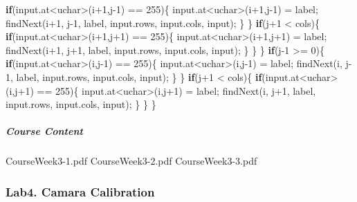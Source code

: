 \documentclass[]{article}
\newenvironment{Shaded}{\begin{snugshade}}{\end{snugshade}}
\newcommand{\KeywordTok}[1]{\textcolor[rgb]{0.13,0.29,0.53}{\textbf{{#1}}}}
\newcommand{\DataTypeTok}[1]{\textcolor[rgb]{0.13,0.29,0.53}{{#1}}}
\newcommand{\DecValTok}[1]{\textcolor[rgb]{0.00,0.00,0.81}{{#1}}}
\newcommand{\NormalTok}[1]{{#1}}
\let\oldsubparagraph\subparagraph
\renewcommand{\subparagraph}[1]{\oldsubparagraph{#1}\mbox{}}
\begin{document}
\begin{Shaded}
\begin{Highlighting}[]
            \KeywordTok{if}\NormalTok{(input.at<}\DataTypeTok{uchar}\NormalTok{>(i}\DecValTok{+1}\NormalTok{,j}\DecValTok{-1}\NormalTok{) == }\DecValTok{255}\NormalTok{)\{}
                \NormalTok{input.at<}\DataTypeTok{uchar}\NormalTok{>(i}\DecValTok{+1}\NormalTok{,j}\DecValTok{-1}\NormalTok{) = label;}
                \NormalTok{findNext(i}\DecValTok{+1}\NormalTok{, j}\DecValTok{-1}\NormalTok{, label, input.rows, input.cols, input);}
            \NormalTok{\}}
        \NormalTok{\}}
        \KeywordTok{if}\NormalTok{(j}\DecValTok{+1} \NormalTok{< cols)\{}
            \KeywordTok{if}\NormalTok{(input.at<}\DataTypeTok{uchar}\NormalTok{>(i}\DecValTok{+1}\NormalTok{,j}\DecValTok{+1}\NormalTok{) == }\DecValTok{255}\NormalTok{)\{}
                \NormalTok{input.at<}\DataTypeTok{uchar}\NormalTok{>(i}\DecValTok{+1}\NormalTok{,j}\DecValTok{+1}\NormalTok{) = label;}
                \NormalTok{findNext(i}\DecValTok{+1}\NormalTok{, j}\DecValTok{+1}\NormalTok{, label, input.rows, input.cols, input);}
            \NormalTok{\}}
        \NormalTok{\}}
    \NormalTok{\}}
    \KeywordTok{if}\NormalTok{(j}\DecValTok{-1} \NormalTok{>= }\DecValTok{0}\NormalTok{)\{}
        \KeywordTok{if}\NormalTok{(input.at<}\DataTypeTok{uchar}\NormalTok{>(i,j}\DecValTok{-1}\NormalTok{) == }\DecValTok{255}\NormalTok{)\{}
            \NormalTok{input.at<}\DataTypeTok{uchar}\NormalTok{>(i,j}\DecValTok{-1}\NormalTok{) = label;}
            \NormalTok{findNext(i, j}\DecValTok{-1}\NormalTok{, label, input.rows, input.cols, input);}
        \NormalTok{\}}
    \NormalTok{\}}
    \KeywordTok{if}\NormalTok{(j}\DecValTok{+1} \NormalTok{< cols)\{}
        \KeywordTok{if}\NormalTok{(input.at<}\DataTypeTok{uchar}\NormalTok{>(i,j}\DecValTok{+1}\NormalTok{) == }\DecValTok{255}\NormalTok{)\{}
            \NormalTok{input.at<}\DataTypeTok{uchar}\NormalTok{>(i,j}\DecValTok{+1}\NormalTok{) = label;}
            \NormalTok{findNext(i, j}\DecValTok{+1}\NormalTok{, label, input.rows, input.cols, input);}
        \NormalTok{\}}
    \NormalTok{\}}
\NormalTok{\}}
\end{Highlighting}
\end{Shaded}

\subparagraph{Course Content}\label{course-content-2}

CourseWeek3-1.pdf CourseWeek3-2.pdf CourseWeek3-3.pdf

\subsubsection{Lab4. Camara Calibration}\label{lab4.-camara-calibration}
\end{document}
